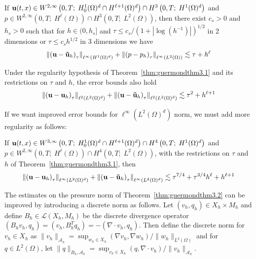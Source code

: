 \documentclass[letterpaper]{erdc}
\begin{document}
\begin{theorem}\label{thm:guermondthm3.2}
If $\textbf{u}(t,x)\in W^{2,\infty}\left(0,T;\; H_0^1(\Omega)^d \cap H^{\ell+1}(\Omega)^d  \right) \cap H^3\left(0,T;\; H^1(\Omega)^d\right)$ and $p\in W^{2,\infty}\left(0,T;\; H^{\ell}(\Omega) \right)\cap H^3\left(0,T;\; L^2(\Omega)\right)$, then there exist $c_s>0$ and $h_s>0$ such that for $h\in (0,h_s]$ and $\tau \leq c_s /\left(1+|\log(h^{-1})| \right)^{1/2}$ in 2 dimensions or $\tau \leq c_s h^{1/2}$ in 3 dimensions we have
  \begin{equation}
    \left\| \left(\textbf{u} - \mathbf{\tilde{u}}_h \right)_{\tau} \right\|_{\ell^{\infty}\left(H^1(\Omega)^d\right)} + \left\| \left(p - p_h \right)_{\tau} \right\|_{\ell^{\infty}\left(L^2(\Omega)\right)} \lesssim \tau + h^{\ell}
  \end{equation}
\end{theorem}

\begin{theorem}\label{thm:guermondthm3.3}
Under the regularity hypothesis of Theorem~\ref{thm:guermondthm3.1} and its restrictions on $\tau$ and $h$, the error bounds also hold
    \begin{equation}
      \left\| \left(\textbf{u} - \textbf{u}_h \right)_{\tau} \right\|_{\ell^{2}\left(L^2(\Omega)^d\right)} + \left\| \left(\textbf{u} - \mathbf{\tilde{u}}_h \right)_{\tau} \right\|_{\ell^{2}\left(L^2(\Omega)^d\right)} \lesssim \tau^2 + h^{\ell+1}
    \end{equation}
\end{theorem}

If we want improved error bounds for $\ell^{\infty}\left( L^2(\Omega)^d \right)$ norm, we must add more regularity as follows:
\begin{theorem}\label{thm:guermondthm3.4}
If $\textbf{u}(t,x)\in W^{3,\infty}\left(0,T;\; H_0^1(\Omega)^d \cap H^{\ell+1}(\Omega)^d  \right) \cap H^4\left(0,T;\; H^1(\Omega)^d\right)$ and $p\in W^{2,\infty}\left(0,T;\; H^{\ell}(\Omega) \right)\cap H^4\left(0,T;\; L^2(\Omega)\right)$, with the restrictions on $\tau$ and $h$ of Theorem~\ref{thm:guermondthm3.1}, then
  \begin{equation}
    \left\| \left(\textbf{u} - \textbf{u}_h \right)_{\tau} \right\|_{\ell^{\infty}\left(L^2(\Omega)^d\right)} + \left\| \left(\textbf{u} - \mathbf{\tilde{u}}_h \right)_{\tau} \right\|_{\ell^{\infty}\left(L^2(\Omega)^d\right)} \lesssim \tau^{7/4} + \tau^{3/4}h^{\ell} + h^{\ell+1}
  \end{equation}
\end{theorem}

The estimates on the pressure norm of Theorem~\ref{thm:guermondthm3.2} can be improved by introducing a discrete norm as follows.  Let $(v_h,q_h) \in X_h\times M_h$ and define $B_h \in \mathcal{L}(X_h,M_h)$ be the discrete divergence operator $(B_h v_h, q_h) = (v_h, B_h^T q_h) = -(\nabla\cdot v_h, q_h)$.  Then define the discrete norm for $v_h \in X_h$ as $\|v_h\|_{\mathcal{A}_h} = \sup_{w_h \in X_h} (\nabla v_h, \nabla w_h)/ \|w_h\|_{L^2(\Omega)}$ and for $q\in L^2(\Omega)$, let $\|q\|_{B_h, \mathcal{A}_h} = \sup_{v_h\in X_h} (q, \nabla\cdot v_h)/ \|v_h\|_{\mathcal{A}_h}$.
\end{document}
